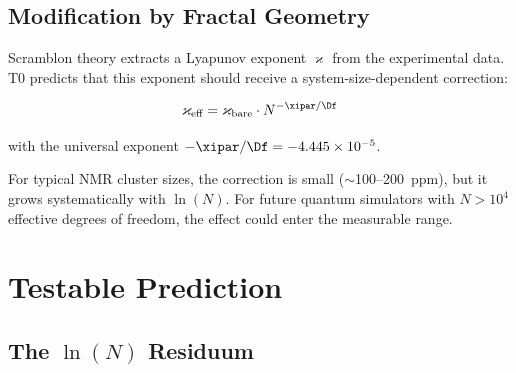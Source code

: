 \subsection{Modification by Fractal Geometry}

Scramblon theory extracts a Lyapunov exponent $\varkappa$ from the experimental data. T0 predicts that this exponent should receive a system-size-dependent correction:

\begin{equation}
	\varkappa_{\text{eff}} = \varkappa_{\text{bare}} \cdot N^{-\xipar/\Df}
	\label{eq:lyapunov_correction}
\end{equation}

with the universal exponent $-\xipar/\Df = -4.445 \times 10^{-5}$.

\begin{table}[h]
	\centering
	\caption{Predicted T0 correction of the Lyapunov exponent}
	\label{tab:lyapunov}
\end{table}

\begin{remark}
	For typical NMR cluster sizes, the correction is small ($\sim$100--200~ppm), but it grows systematically with $\ln(N)$. For future quantum simulators with $N > 10^4$ effective degrees of freedom, the effect could enter the measurable range.
\end{remark}


\section{Testable Prediction}
\label{sec:prediction}

\subsection{The $\ln(N)$ Residuum}


